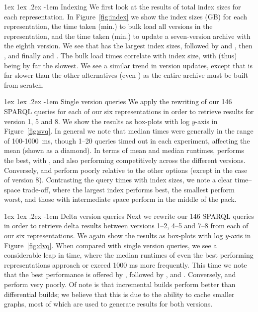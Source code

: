 \documentclass{llncs}
\makeatletter
\renewcommand\paragraph{\@startsection{paragraph}{4}{\z@}%
	{1ex \@plus1ex \@minus.2ex}%
	{-1em}%
	{\normalfont\normalsize\itshape}}
\makeatother
\begin{document}
\paragraph{Indexing} We first look at the results of total index sizes for each representation. In Figure~\ref{fig:index} we show the index sizes (GB) for each representation, the time taken (min.) to bulk load all versions in the representation, and the time taken (min.) to update a seven-version archive with the eighth version. We see that \ic has the largest index sizes, followed by \cbpd and \cbmd, then \tb, and finally \cbpi and \cbmi. The bulk load times correlate with index size, with \ic (thus) being by far the slowest. We see a similar trend in version updates, except that \cbmi is far slower than the other alternatives (even \ic) as the entire archive must be built from scratch.

\paragraph{Single version queries} We apply the rewriting of our 146 SPARQL queries for each of our six representations in order to retrieve results for version 1, 5 and 8. We show the results as box-plots with log $y$-axis in Figure~\ref{fig:svq}. In general we note that median times were generally in the range of 100-1000~ms, though 1--20 queries timed out in each experiment, affecting the mean (shown as a diamond). In terms of mean and median runtimes, \ic performs the best, with \cbpd, \cbmd and \tb also performing competitively across the different versions. Conversely, \cbpi and \cbmi perform poorly relative to the other options (except \cbmi in the case of version 8). Contrasting the query times with index sizes, we note a clear time--space trade-off, where the largest index performs best, the smallest perform worst, and those with intermediate space perform in the middle of the pack. 

\paragraph{Delta version queries} Next we rewrite our 146 SPARQL queries in order to retrieve delta results between versions 1--2, 4--5 and 7--8 from each of our six representations. We again show the results as box-plots with log $y$-axis in Figure~\ref{fig:dvq}. When compared with single version queries, we see a considerable leap in time, where the median runtimes of even the best performing representations approach or exceed 1000 ms more frequently. This time we note that the best performance is offered by \tb, followed by \ic, \cbpi and \cbmi. Conversely,  \cbpd and \cbmd perform very poorly. Of note is that incremental builds perform better than differential builds; we believe that this is due to the ability to cache smaller graphs, most of which are used to generate results for both versions.
\end{document}
